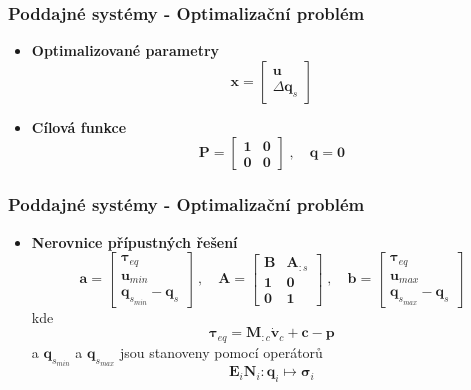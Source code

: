 	\begin{frame}
		\frametitle{Poddajné systémy - Optimalizační problém}

		\begin{itemize}
			\item \textbf{Optimalizované parametry}\\
			\begin{equation*}
				\bm{x} = \begin{bmatrix} \bm{u} \\ \Delta\bm{q}_s \end{bmatrix}
			\end{equation*}
			\item \textbf{Cílová funkce}\\
			\begin{equation*}
				\bm{P}
				=
				\begin{bmatrix}
					\bm{1} & \bm{0} \\
					\bm{0} & \bm{0}
				\end{bmatrix}
				\;,\quad
				\bm{q} = \bm{0}
			\end{equation*}
		\end{itemize}
	\end{frame}

	\begin{frame}
		\frametitle{Poddajné systémy - Optimalizační problém}
		
		\begin{itemize}
			\item \textbf{Nerovnice přípustných řešení}\\
			\begin{equation*}
				\bm{a}
				=
				\begin{bmatrix}
					\bm{\tau}_{eq} \\
					\bm{u}_{min} \\
					\bm{q}_{s_{min}} - \bm{q}_s
				\end{bmatrix}
				\;,\quad 
				\bm{A}
				=
				\begin{bmatrix}
					\bm{B} & \bm{A}_{:s} \\
					\bm{1} & \bm{0} \\
					\bm{0} & \bm{1}
				\end{bmatrix}
				\;,\quad
				\bm{b}
				=
				\begin{bmatrix}
					\bm{\tau}_{eq} \\
					\bm{u}_{max} \\
					\bm{q}_{s_{max}} - \bm{q}_s
				\end{bmatrix}
			\end{equation*}
			kde
			\begin{equation*}
				\bm{\tau}_{eq} = \bm{M}_{:c} \bm{\dot{v}}_c + \bm{c} - \bm{p}
			\end{equation*}
			a $\bm{q}_{s_{min}}$ a $\bm{q}_{s_{max}}$ jsou stanoveny pomocí operátorů
			\begin{equation*}
				\bm{E}_i\bm{N}_i : \bm{q}_i \mapsto \bm{\sigma}_i
			\end{equation*}
		\end{itemize}
	\end{frame}